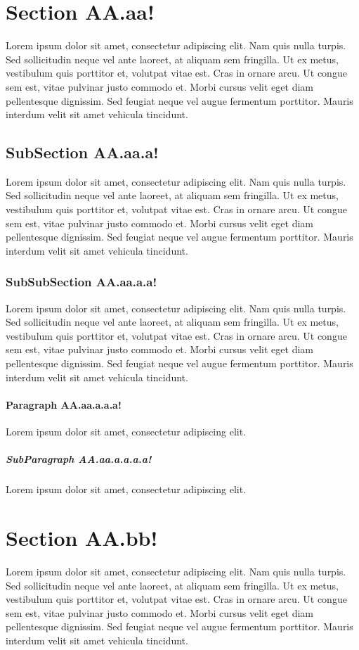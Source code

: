 \documentclass[a4paper,10pt]{report}
\begin{document}
\section{Section AA.aa!}
Lorem ipsum dolor sit amet, consectetur adipiscing elit. Nam quis nulla turpis. Sed sollicitudin
neque vel ante laoreet, at aliquam sem fringilla. Ut ex metus, vestibulum quis porttitor et, volutpat
vitae est. Cras in ornare arcu. Ut congue sem est, vitae pulvinar justo commodo et. Morbi cursus
velit eget diam pellentesque dignissim. Sed feugiat neque vel augue fermentum porttitor. Mauris
interdum velit sit amet vehicula tincidunt.
\subsection{SubSection AA.aa.a!}
Lorem ipsum dolor sit amet, consectetur adipiscing elit. Nam quis nulla turpis. Sed sollicitudin
neque vel ante laoreet, at aliquam sem fringilla. Ut ex metus, vestibulum quis porttitor et, volutpat
vitae est. Cras in ornare arcu. Ut congue sem est, vitae pulvinar justo commodo et. Morbi cursus
velit eget diam pellentesque dignissim. Sed feugiat neque vel augue fermentum porttitor. Mauris
interdum velit sit amet vehicula tincidunt.
\subsubsection{SubSubSection AA.aa.a.a!}
Lorem ipsum dolor sit amet, consectetur adipiscing elit. Nam quis nulla turpis. Sed sollicitudin
neque vel ante laoreet, at aliquam sem fringilla. Ut ex metus, vestibulum quis porttitor et, volutpat
vitae est. Cras in ornare arcu. Ut congue sem est, vitae pulvinar justo commodo et. Morbi cursus
velit eget diam pellentesque dignissim. Sed feugiat neque vel augue fermentum porttitor. Mauris
interdum velit sit amet vehicula tincidunt.
\paragraph{Paragraph AA.aa.a.a.a!}
Lorem ipsum dolor sit amet, consectetur adipiscing elit.
\subparagraph{SubParagraph AA.aa.a.a.a.a!}
Lorem ipsum dolor sit amet, consectetur adipiscing elit.

\section{Section  AA.bb!}
Lorem ipsum dolor sit amet, consectetur adipiscing elit. Nam quis nulla turpis. Sed sollicitudin
neque vel ante laoreet, at aliquam sem fringilla. Ut ex metus, vestibulum quis porttitor et, volutpat
vitae est. Cras in ornare arcu. Ut congue sem est, vitae pulvinar justo commodo et. Morbi cursus
velit eget diam pellentesque dignissim. Sed feugiat neque vel augue fermentum porttitor. Mauris
interdum velit sit amet vehicula tincidunt.
\end{document}
